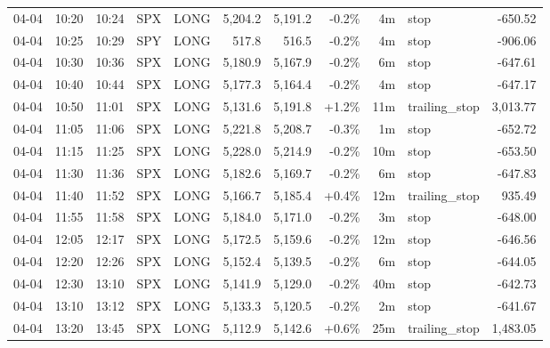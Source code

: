 \documentclass[11pt,a4paper,twoside]{article}
\begin{document}
\begin{center}
\begin{longtable}{>{\color{txtmain}}l l l l l r r r r >{\color{txtmain}}l r}
04-04 & 10:20 & 10:24 & SPX & LONG & 5,204.2 & 5,191.2 & \textcolor{lossred}{-0.2\%} & 4m & stop & \textcolor{lossred}{-650.52} \\
04-04 & 10:25 & 10:29 & SPY & LONG & 517.8 & 516.5 & \textcolor{lossred}{-0.2\%} & 4m & stop & \textcolor{lossred}{-906.06} \\
04-04 & 10:30 & 10:36 & SPX & LONG & 5,180.9 & 5,167.9 & \textcolor{lossred}{-0.2\%} & 6m & stop & \textcolor{lossred}{-647.61} \\
04-04 & 10:40 & 10:44 & SPX & LONG & 5,177.3 & 5,164.4 & \textcolor{lossred}{-0.2\%} & 4m & stop & \textcolor{lossred}{-647.17} \\
04-04 & 10:50 & 11:01 & SPX & LONG & 5,131.6 & 5,191.8 & \textcolor{wingreen}{+1.2\%} & 11m & trailing\_stop & \textcolor{wingreen}{3,013.77} \\
04-04 & 11:05 & 11:06 & SPX & LONG & 5,221.8 & 5,208.7 & \textcolor{lossred}{-0.3\%} & 1m & stop & \textcolor{lossred}{-652.72} \\
04-04 & 11:15 & 11:25 & SPX & LONG & 5,228.0 & 5,214.9 & \textcolor{lossred}{-0.2\%} & 10m & stop & \textcolor{lossred}{-653.50} \\
04-04 & 11:30 & 11:36 & SPX & LONG & 5,182.6 & 5,169.7 & \textcolor{lossred}{-0.2\%} & 6m & stop & \textcolor{lossred}{-647.83} \\
04-04 & 11:40 & 11:52 & SPX & LONG & 5,166.7 & 5,185.4 & \textcolor{wingreen}{+0.4\%} & 12m & trailing\_stop & \textcolor{wingreen}{935.49} \\
04-04 & 11:55 & 11:58 & SPX & LONG & 5,184.0 & 5,171.0 & \textcolor{lossred}{-0.2\%} & 3m & stop & \textcolor{lossred}{-648.00} \\
04-04 & 12:05 & 12:17 & SPX & LONG & 5,172.5 & 5,159.6 & \textcolor{lossred}{-0.2\%} & 12m & stop & \textcolor{lossred}{-646.56} \\
04-04 & 12:20 & 12:26 & SPX & LONG & 5,152.4 & 5,139.5 & \textcolor{lossred}{-0.2\%} & 6m & stop & \textcolor{lossred}{-644.05} \\
04-04 & 12:30 & 13:10 & SPX & LONG & 5,141.9 & 5,129.0 & \textcolor{lossred}{-0.2\%} & 40m & stop & \textcolor{lossred}{-642.73} \\
04-04 & 13:10 & 13:12 & SPX & LONG & 5,133.3 & 5,120.5 & \textcolor{lossred}{-0.2\%} & 2m & stop & \textcolor{lossred}{-641.67} \\
04-04 & 13:20 & 13:45 & SPX & LONG & 5,112.9 & 5,142.6 & \textcolor{wingreen}{+0.6\%} & 25m & trailing\_stop & \textcolor{wingreen}{1,483.05} \\

\end{longtable}
\end{center}
\end{document}
